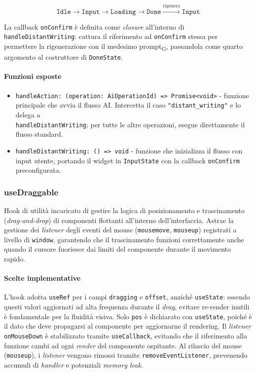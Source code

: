 \documentclass[11pt,a4paper]{article}
\newcommand{\gls}[1]{#1\textsubscript{G}}
\begin{document}
\begin{equation*}
\texttt{Idle} \to \texttt{Input} \to \texttt{Loading} \to \texttt{Done} \xrightarrow{\text{rigenera}} \texttt{Input}
\end{equation*}

La callback \texttt{onConfirm} è definita come \textit{closure} all'interno di \texttt{handleDistantWriting}: cattura il riferimento ad \texttt{onConfirm} stessa per permettere la rigenerazione con il medesimo \gls{prompt}, passandola come quarto argomento al costruttore di \texttt{DoneState}.

\paragraph{Funzioni esposte}
\begin{itemize}
    \item \texttt{handleAction: (operation: AiOperationId) => Promise<void>} - funzione principale che avvia il flusso AI. Intercetta il caso \texttt{"distant\_writing"} e lo delega a \\ \texttt{handleDistantWriting}; per tutte le altre operazioni, esegue direttamente il flusso standard.
    \item \texttt{handleDistantWriting: () => void} - funzione che inizializza il flusso con input utente, portando il widget in \texttt{InputState} con la callback \texttt{onConfirm} preconfigurata.
\end{itemize}


\subsubsection{useDraggable}
Hook di utilità incaricato di gestire la logica di posizionamento e trascinamento (\textit{drag-and-drop}) di componenti flottanti all'interno dell'interfaccia. Astrae la gestione dei \textit{listener} degli eventi del mouse (\texttt{mousemove}, \texttt{mouseup}) registrati a livello di \texttt{window}, garantendo che il trascinamento funzioni correttamente anche quando il cursore fuoriesce dai limiti del componente durante il movimento rapido.

\paragraph{Scelte implementative}
L'hook adotta \texttt{useRef} per i campi \texttt{dragging} e \texttt{offset}, anziché \texttt{useState}: essendo questi valori aggiornati ad alta frequenza durante il \textit{drag}, evitare re-render inutili è fondamentale per la fluidità visiva. Solo \texttt{pos} è dichiarato con \texttt{useState}, poiché è il dato che deve propagarsi al componente per aggiornarne il rendering. Il \textit{listener} \texttt{onMouseDown} è stabilizzato tramite \texttt{useCallback}, evitando che il riferimento alla funzione cambi ad ogni \textit{render} del componente ospitante. Al rilascio del mouse (\texttt{mouseup}), i \textit{listener} vengono rimossi tramite \texttt{removeEventListener}, prevenendo accumuli di \textit{handler} e potenziali \textit{memory leak}.
\end{document}
